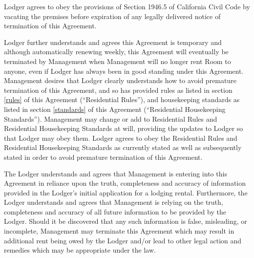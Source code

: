 \documentclass[12pt,letterpaper]{article}
\newcommand{\lodger}{Lodger}
\newcommand{\rules}{Residential Rules}
\newcommand{\standards}{Residential Housekeeping Standards}
\newcommand{\management}{Management}
\newcommand{\room}{Room}
\begin{document}
\lodger{} agrees to obey the provisions of Section 1946.5 of California Civil Code by vacating the premises before expiration of any legally delivered notice of termination of this Agreement.

\lodger{} further understands and agrees this Agreement is temporary and although automatically renewing weekly, this Agreement will eventually be terminated by \management{} when \management{} will no longer rent \room{} to anyone, even if \lodger{} has always been in good standing under this Agreement. \management{} desires that \lodger{} clearly understands how to avoid premature termination of this Agreement, and so has provided rules as listed in section \ref{rules} of this Agreement (``\rules{}''), and housekeeping standards as listed in section \ref{standards} of this Agreement (``\standards{}''). \management{} may change or add to \rules{} and \standards{} at will, providing the updates to \lodger{} so that \lodger{} may obey them. \lodger{} agrees to obey the \rules{} and \standards{} as currently stated as well as subsequently stated in order to avoid premature termination of this Agreement.

The \lodger{} understands and agrees that \management{} is entering into this Agreement in reliance upon the truth, completeness and accuracy of information provided in the \lodger{}'s initial application for a lodging rental. Furthermore, the \lodger{} understands and agrees that \management{} is relying on the truth, completeness and accuracy of all future information to be provided by the \lodger{}. Should it be discovered that any such information is false, misleading, or incomplete, \management{} may terminate this Agreement which may result in additional rent being owed by the \lodger{} and/or lead to other legal action and remedies which may be appropriate under the law. 
\end{document}
